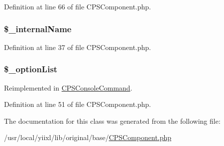 Definition at line 66 of file CPSComponent.php.

\hypertarget{classCPSComponent_a0a975e9ff0c33b78b80a00bf6f3429c3}{
\subsubsection[{\$\_\-internalName}]{\setlength{\rightskip}{0pt plus 5cm}\$\_\-internalName}}
\label{classCPSComponent_a0a975e9ff0c33b78b80a00bf6f3429c3}


Definition at line 37 of file CPSComponent.php.

\hypertarget{classCPSComponent_ac61132f2a103a25486245470090b0046}{
\subsubsection[{\$\_\-optionList}]{\setlength{\rightskip}{0pt plus 5cm}\$\_\-optionList}}
\label{classCPSComponent_ac61132f2a103a25486245470090b0046}


Reimplemented in \hyperlink{classCPSConsoleCommand_ac61132f2a103a25486245470090b0046}{CPSConsoleCommand}.



Definition at line 51 of file CPSComponent.php.



The documentation for this class was generated from the following file:\begin{DoxyCompactItemize}
\item 
/usr/local/yiixl/lib/original/base/\hyperlink{CPSComponent_8php}{CPSComponent.php}\end{DoxyCompactItemize}
